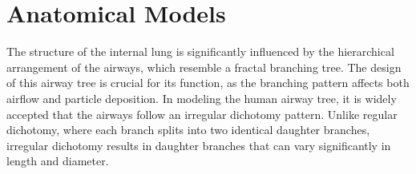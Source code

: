 \section{Anatomical Models}



The structure of the internal lung is significantly influenced by the
hierarchical arrangement of the airways, which resemble a fractal
branching tree\cite{suki2011}. The design of this airway tree is
crucial for its function, as the branching pattern affects both
airflow and particle deposition. In modeling the human airway tree, it
is widely accepted that the airways follow an irregular dichotomy
pattern. Unlike regular dichotomy, where each branch splits into two
identical daughter branches, irregular dichotomy results in daughter
branches that can vary significantly in length and diameter.

